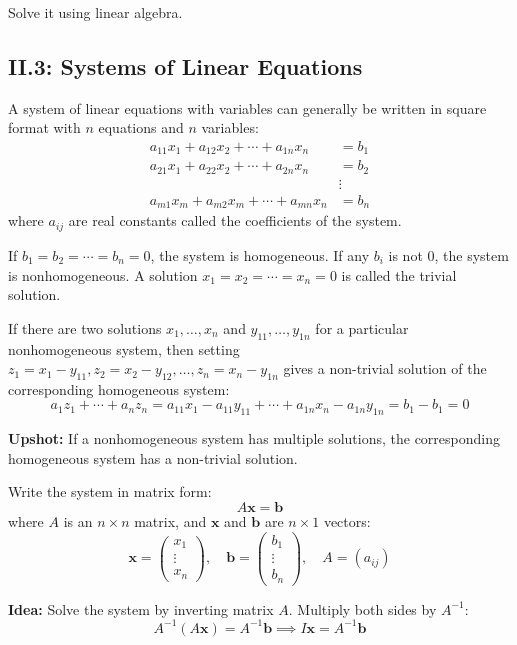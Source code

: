 \documentclass{article}
\begin{document}
Solve it using linear algebra.

\subsection*{II.3: Systems of Linear Equations}

A system of linear equations with variables can generally be written in square format with \( n \) equations and \( n \) variables:
\[
\begin{aligned}
a_{11}x_1 + a_{12}x_2 + \cdots + a_{1n}x_n &= b_1 \\
a_{21}x_1 + a_{22}x_2 + \cdots + a_{2n}x_n &= b_2 \\
&\vdots \\
a_{m1}x_m + a_{m2}x_m + \cdots + a_{mn}x_n &= b_n
\end{aligned}
\]
where \( a_{ij} \) are real constants called the coefficients of the system.

If \( b_1 = b_2 = \cdots = b_n = 0 \), the system is homogeneous. If any \( b_i \) is not 0, the system is nonhomogeneous. A solution \( x_1 = x_2 = \cdots = x_n = 0 \) is called the trivial solution.

If there are two solutions \( x_1, \ldots, x_n \) and \( y_{11}, \ldots, y_{1n} \) for a particular nonhomogeneous system, then setting \( z_1 = x_1 - y_{11}, z_2 = x_2 - y_{12}, \ldots, z_n = x_n - y_{1n} \) gives a non-trivial solution of the corresponding homogeneous system:
\[
a_1z_1 + \cdots + a_nz_n = a_{11}x_1 - a_{11}y_{11} + \cdots + a_{1n}x_n - a_{1n}y_{1n} = b_1 - b_1 = 0
\]

\textbf{Upshot:} If a nonhomogeneous system has multiple solutions, the corresponding homogeneous system has a non-trivial solution.

Write the system in matrix form:
\[
A \mathbf{x} = \mathbf{b}
\]
where \( A \) is an \( n \times n \) matrix, and \( \mathbf{x} \) and \( \mathbf{b} \) are \( n \times 1 \) vectors:
\[
\mathbf{x} = \begin{pmatrix}
x_1 \\
\vdots \\
x_n
\end{pmatrix}, \quad
\mathbf{b} = \begin{pmatrix}
b_1 \\
\vdots \\
b_n
\end{pmatrix}, \quad
A = (a_{ij})
\]

\textbf{Idea:} Solve the system by inverting matrix \( A \). Multiply both sides by \( A^{-1} \):
\[
A^{-1} (A \mathbf{x}) = A^{-1} \mathbf{b} \implies I \mathbf{x} = A^{-1} \mathbf{b}
\]
\end{document}
